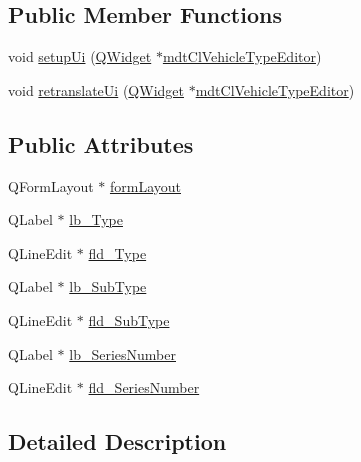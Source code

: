 \subsection*{Public Member Functions}
\begin{DoxyCompactItemize}
\item 
void \hyperlink{class_ui__mdt_cl_vehicle_type_editor_a6acb8a65b12d7e700c5845d323faf98b}{setup\-Ui} (\hyperlink{class_q_widget}{Q\-Widget} $\ast$\hyperlink{classmdt_cl_vehicle_type_editor}{mdt\-Cl\-Vehicle\-Type\-Editor})
\item 
void \hyperlink{class_ui__mdt_cl_vehicle_type_editor_a265d8cce01fd1ad9a1a08d8693da4b8e}{retranslate\-Ui} (\hyperlink{class_q_widget}{Q\-Widget} $\ast$\hyperlink{classmdt_cl_vehicle_type_editor}{mdt\-Cl\-Vehicle\-Type\-Editor})
\end{DoxyCompactItemize}
\subsection*{Public Attributes}
\begin{DoxyCompactItemize}
\item 
Q\-Form\-Layout $\ast$ \hyperlink{class_ui__mdt_cl_vehicle_type_editor_a40784adcad4d2daddb0cbbc49bfde0b7}{form\-Layout}
\item 
Q\-Label $\ast$ \hyperlink{class_ui__mdt_cl_vehicle_type_editor_a8dda7a0d2d6d159de24132e51875379c}{lb\-\_\-\-Type}
\item 
Q\-Line\-Edit $\ast$ \hyperlink{class_ui__mdt_cl_vehicle_type_editor_a697e3175e1d3d3a7b221222fe4641b5a}{fld\-\_\-\-Type}
\item 
Q\-Label $\ast$ \hyperlink{class_ui__mdt_cl_vehicle_type_editor_a4b29f6b96b25437af600143665f6c348}{lb\-\_\-\-Sub\-Type}
\item 
Q\-Line\-Edit $\ast$ \hyperlink{class_ui__mdt_cl_vehicle_type_editor_a3c780fa693f1f87ecb2573f2491faa9f}{fld\-\_\-\-Sub\-Type}
\item 
Q\-Label $\ast$ \hyperlink{class_ui__mdt_cl_vehicle_type_editor_abb19b012a4c9a91f03c4528a0902d790}{lb\-\_\-\-Series\-Number}
\item 
Q\-Line\-Edit $\ast$ \hyperlink{class_ui__mdt_cl_vehicle_type_editor_aa2538616b1e55429786e5eb82ed603dc}{fld\-\_\-\-Series\-Number}
\end{DoxyCompactItemize}


\subsection{Detailed Description}



